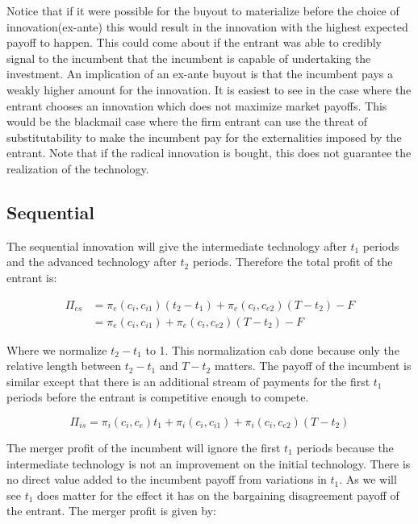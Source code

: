 Notice that if it were possible for the buyout to materialize before the choice of innovation(ex-ante) this would result in the innovation with the highest expected payoff to happen. This could come about if the entrant was able to credibly signal to the incumbent that the incumbent is capable of undertaking the investment. An implication of an ex-ante buyout is that the incumbent pays a weakly higher amount for the innovation. It is easiest to see in the case where the entrant chooses an innovation which does not maximize market payoffs. This would be the blackmail case where the firm entrant can use the threat of substitutability to make the incumbent pay for the externalities imposed by the entrant. Note that if the radical innovation is bought, this does not guarantee the realization of the technology. 

\subsection{Sequential}

The sequential innovation will give the intermediate technology after $t_1$ periods and the advanced technology after $t_2$ periods. Therefore the total profit of the entrant is: 

\begin{align*}
\Pi_{es} &= \pi_e(c_i,c_{i1}) (t_2-t_1) +\pi_e(c_i,c_{e2})(T-t_2)-F \\
&= \pi_e(c_i,c_{i1}) +\pi_e(c_i,c_{e2})(T-t_2)-F
\end{align*}

Where we normalize $t_2-t_1$ to 1. This normalization cab done because only the relative length between $t_2-t_1$ and $T-t_2$ matters. The payoff of the incumbent is similar except that there is an additional stream of payments for the first $t_1$ periods before the entrant is competitive enough to compete. 

\begin{equation*}
\Pi_{is} = \pi_i(c_i,c_{e})t_1+\pi_i(c_i,c_{i1}) +\pi_i(c_i,c_{e2})(T-t_2)
\end{equation*}

The merger profit of the incumbent will ignore the first $t_1$ periods because the intermediate technology is not an improvement on the initial technology. There is no direct value added to the incumbent payoff from variations in $t_1$. As we will see $t_1$ does matter for the effect it has on the bargaining disagreement payoff of the entrant. The merger profit is given by: 

